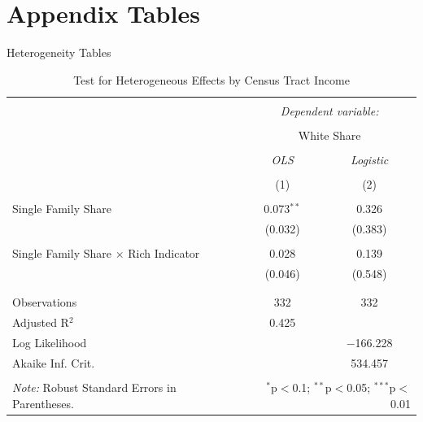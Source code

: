 \documentclass{beamer}
\begin{document}
\section*{Appendix Tables}

\begin{frame}{Heterogeneity Tables}
    \tiny
    \begin{table}[!htbp] \centering 
  \caption{Test for Heterogeneous Effects by Census Tract Income} 
  \label{tab:income_heterogeneity} 
\begin{tabular}{@{\extracolsep{5pt}}lcc} 
\\[-1.8ex]\hline 
\hline \\[-1.8ex] 
 & \multicolumn{2}{c}{\textit{Dependent variable:}} \\ 
\cline{2-3} 
\\[-1.8ex] & \multicolumn{2}{c}{White Share} \\ 
\\[-1.8ex] & \textit{OLS} & \textit{Logistic} \\ 
\\[-1.8ex] & (1) & (2)\\ 
\hline \\[-1.8ex] 
 Single Family Share & 0.073$^{**}$ & 0.326 \\ 
  & (0.032) & (0.383) \\ 
  & & \\ 
 Single Family Share $\times$ Rich Indicator & 0.028 & 0.139 \\ 
  & (0.046) & (0.548) \\ 
  & & \\ 
\hline \\[-1.8ex] 
Observations & 332 & 332 \\ 
Adjusted R$^{2}$ & 0.425 &  \\ 
Log Likelihood &  & $-$166.228 \\ 
Akaike Inf. Crit. &  & 534.457 \\ 
\hline 
\hline \\[-1.8ex] 
\textit{Note:} Robust Standard Errors in Parentheses.  & \multicolumn{2}{r}{$^{*}$p$<$0.1; $^{**}$p$<$0.05; $^{***}$p$<$0.01} \\ 
\end{tabular} 
\end{table} 
\end{frame}
\end{document}
